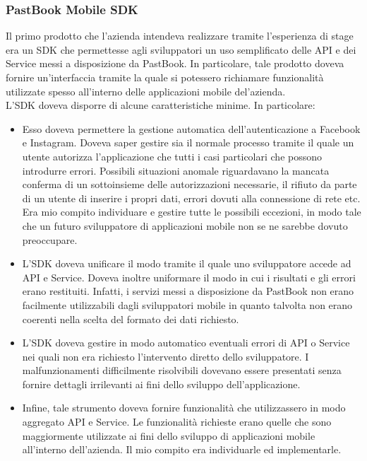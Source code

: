 			\subsubsection{PastBook Mobile SDK}
				Il primo prodotto che l'azienda intendeva realizzare tramite l'esperienza di stage era un SDK che permettesse agli
				sviluppatori un uso semplificato delle API e dei Service messi a disposizione da PastBook. In particolare, tale
				prodotto doveva fornire un'interfaccia tramite la quale si potessero richiamare funzionalità utilizzate spesso
				all'interno delle applicazioni mobile del'azienda.\\
				L'SDK doveva disporre di alcune caratteristiche minime. In particolare:
				\begin{itemize}
					\item Esso doveva permettere la gestione automatica dell'autenticazione a Facebook e Instagram. Doveva saper
					gestire sia il normale processo tramite il quale un utente autorizza l'applicazione che tutti i casi
					particolari che possono introdurre errori. Possibili situazioni anomale riguardavano la mancata conferma di
					un sottoinsieme delle autorizzazioni necessarie, il rifiuto da parte di un utente di inserire i propri dati,
					errori dovuti alla connessione di rete etc. Era mio compito individuare e gestire tutte le possibili
					eccezioni, in modo tale che un futuro sviluppatore di applicazioni mobile non se ne sarebbe dovuto
					preoccupare.
					\item L'SDK doveva unificare il modo tramite il quale uno sviluppatore accede ad API e Service. Doveva
					inoltre uniformare il modo in cui i risultati e gli errori erano restituiti. Infatti, i servizi messi a
					disposizione da PastBook non erano facilmente utilizzabili dagli sviluppatori mobile in quanto talvolta non
					erano coerenti nella scelta del formato dei dati richiesto.
					\item L'SDK doveva gestire in modo automatico eventuali errori di API o Service nei quali non era richiesto
					l'intervento diretto dello sviluppatore. I malfunzionamenti difficilmente risolvibili dovevano essere
					presentati senza fornire dettagli irrilevanti ai fini dello sviluppo dell'applicazione.
					\item Infine, tale strumento doveva fornire funzionalità che utilizzassero in modo aggregato API e Service.
					Le funzionalità richieste erano quelle che sono maggiormente utilizzate ai fini dello sviluppo di 
					applicazioni mobile all'interno dell'azienda. Il mio compito era individuarle ed implementarle.
				\end{itemize}
